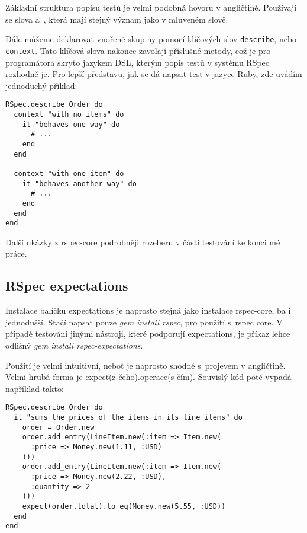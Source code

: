 \par Základní struktura popisu testů je velmi podobná hovoru v angličtině. Používají se slova  a~, která mají stejný význam jako v mluveném slově.

\par Dále můžeme deklarovat vnořené skupiny pomocí klíčových slov \texttt{describe}, nebo \texttt{context}. Tato klíčová slova nakonec zavolají příslušné metody, což je pro programátora skryto jazykem DSL, kterým popis testů v systému RSpec rozhodně je. Pro lepší představu, jak se dá napsat test v jazyce Ruby, zde uvádím jednoduchý příklad:
\begin{verbatim}
RSpec.describe Order do
  context "with no items" do
    it "behaves one way" do
      # ...
    end
  end

  context "with one item" do
    it "behaves another way" do
      # ...
    end
  end
end
\end{verbatim}
Další ukázky z rspec-core podrobněji rozeberu v části testování ke konci mé práce.

\subsection{RSpec expectations}
\par Instalace balíčku expectations je naprosto stejná jako instalace rspec-core, ba i jednodušší. Stačí napsat pouze \textit{gem install rspec}, pro použití s~rspec core. V případě testování jinými nástroji, které podporují expectations, je příkaz lehce odlišný \textit{gem install rspec-expectations}.


\par Použití je velmi intuitivní, neboť je naprosto shodné s~projevem v angličtině. Velmi hrubá forma je expect(z čeho).operace(s čím). Souvislý kód poté vypadá například takto:
\begin{verbatim}
RSpec.describe Order do
  it "sums the prices of the items in its line items" do
    order = Order.new
    order.add_entry(LineItem.new(:item => Item.new(
      :price => Money.new(1.11, :USD)
    )))
    order.add_entry(LineItem.new(:item => Item.new(
      :price => Money.new(2.22, :USD),
      :quantity => 2
    )))
    expect(order.total).to eq(Money.new(5.55, :USD))
  end
end
\end{verbatim}

